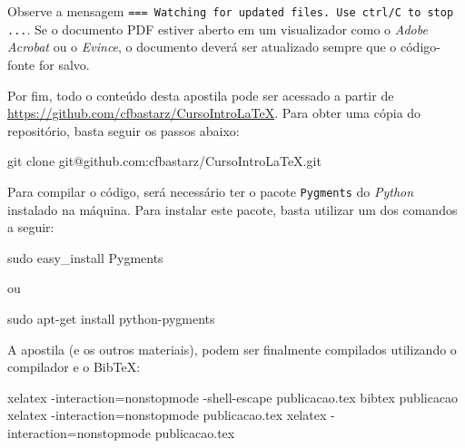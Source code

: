Observe a mensagem {\tt === Watching for updated files. Use ctrl/C to stop ...}. Se o documento PDF estiver aberto em um visualizador como o \textit{Adobe Acrobat} ou o \textit{Evince}, o documento deverá ser atualizado sempre que o código-fonte for salvo.

Por fim, todo o conteúdo desta apostila pode ser acessado a partir de \url{https://github.com/cfbastarz/CursoIntroLaTeX}. Para obter uma cópia do repositório, basta seguir os passos abaixo:

\begin{meucomando}
git clone git@github.com:cfbastarz/CursoIntroLaTeX.git
\end{meucomando}

Para compilar o código, será necessário ter o pacote {\tt Pygments} do \textit{Python} instalado na máquina. Para instalar este pacote, basta utilizar um dos comandos a seguir:

\begin{meucomando}
sudo easy_install Pygments
\end{meucomando}

ou

\begin{meucomando}
sudo apt-get install python-pygments
\end{meucomando}

A apostila (e os outros materiais), podem ser finalmente compilados utilizando o compilador \XeLaTeX{} e o Bib\TeX{}:

\begin{meucomando}
xelatex -interaction=nonstopmode -shell-escape publicacao.tex
bibtex publicacao
xelatex -interaction=nonstopmode publicacao.tex
xelatex -interaction=nonstopmode publicacao.tex
\end{meucomando}
